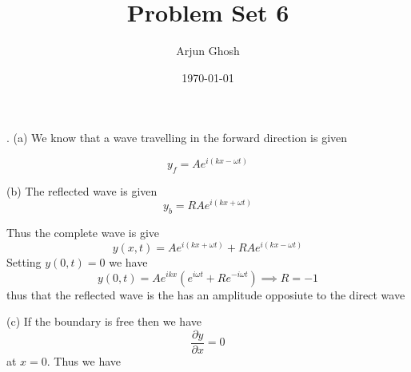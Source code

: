 \documentclass[12pt]{article}
\title{Problem Set 6}
\author{Arjun Ghosh}
\date{\today}
\begin{document}
. (a)
We know that a wave travelling in the forward direction is given

$$
y_{f} = Ae^{i ( kx - \omega t ) }
$$

(b)
The reflected wave is given
$$
y_{b} = RAe^{i ( kx + \omega t ) }
$$

Thus the complete wave is give
$$
y(x,t) = Ae^{i ( kx + \omega t ) }+ RAe^{i ( kx - \omega t ) }
$$
Setting $y(0,t) = 0$ we have
$$
y(0,t) = A e^{ikx} ( e^{i \omega t} + R e^{-i \omega t} ) \implies R = -1
$$
thus that the reflected wave is the has an amplitude opposiute to the direct wave

(c) 
If the boundary is free then we have
$$\frac{\partial y}{\partial x} = 0
$$
at $x = 0$. Thus we have
\end{document}
